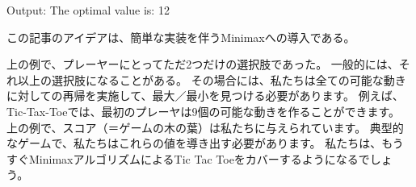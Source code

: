 \documentclass[uplatex,a4paper,11pt,oneside,openany]{jsbook}
\begin{document}
\begin{itembox}[l]{Output:}
The optimal value is:  12
\end{itembox}

この記事のアイデアは、簡単な実装を伴うMinimaxへの導入である。

上の例で、プレーヤーにとってただ2つだけの選択肢であった。
一般的には、それ以上の選択肢になることがある。
その場合には、私たちは全ての可能な動きに対しての再帰を実施して、最大／最小を見つける必要があります。
例えば、Tic-Tax-Toeでは、最初のプレーヤは9個の可能な動きを作ることができます。
上の例で、スコア（＝ゲームの木の葉）は私たちに与えられています。
典型的なゲームで、私たちはこれらの値を導き出す必要があります。
私たちは、もうすぐMinimaxアルゴリズムによるTic Tac Toeをカバーするようになるでしょう。

\end{document}
